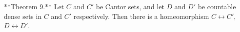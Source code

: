 **Theorem 9.** Let $C$ and $C'$ be Cantor sets, and let $D$ and $D'$ be countable dense sets in $C$ and $C'$ respectively. Then there is a homeomorphism $C \leftrightarrow C'$, $D \leftrightarrow D'$.

